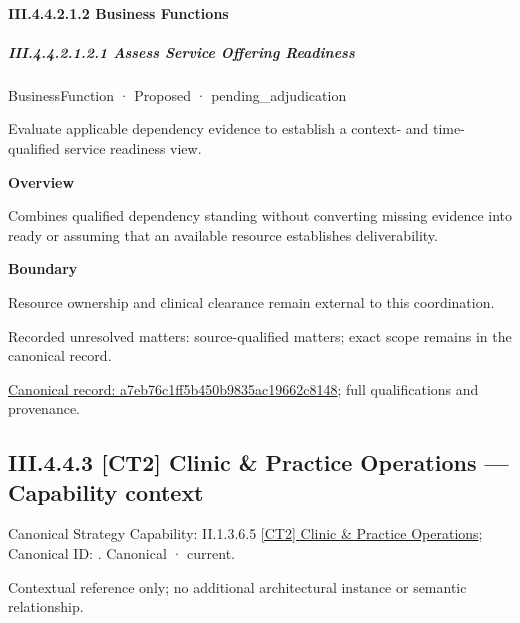 \paragraph*{III.4.4.2.1.2 Business Functions}
\label{navigation:III.4.4.2.1.2}

\subparagraph*{III.4.4.2.1.2.1 Assess Service Offering Readiness}
\label{navigation:III.4.4.2.1.2.1}

\label{element:a7eb76c1ff5b450b9835ac19662c8148}
{\small BusinessFunction · Proposed · pending\_adjudication}\par

Evaluate applicable dependency evidence to establish a context- and time-qualified service readiness view.



\textbf{Overview}



Combines qualified dependency standing without converting missing evidence into ready or assuming that an available resource establishes deliverability.



\textbf{Boundary}



Resource ownership and clinical clearance remain external to this coordination.


{\small Recorded unresolved matters: source-qualified matters; exact scope remains in the canonical record.}\par
{\footnotesize \href{../../../../../../../continuum/business/business-function/a7eb76c1ff5b450b9835ac19662c8148.md}{Canonical record: a7eb76c1ff5b450b9835ac19662c8148}; full qualifications and provenance.}\par
\subsection*{III.4.4.3 [CT2] Clinic \& Practice Operations — Capability context}
\label{navigation:III.4.4.3}

{\small Canonical Strategy Capability: II.1.3.6.5 \hyperref[element:3dffe63e03124efab255204ee4e9a5d9]{[CT2] Clinic \& Practice Operations}; Canonical ID: \texttt{}. Canonical · current.}\par
Contextual reference only; no additional architectural instance or semantic relationship.\par
